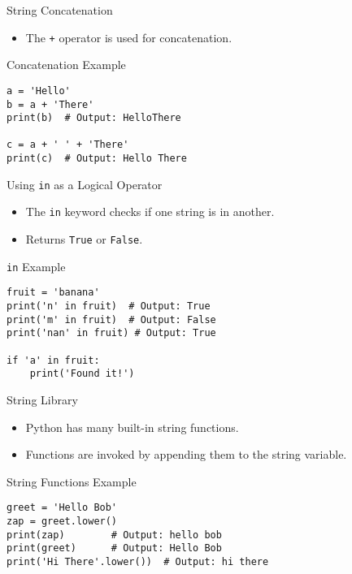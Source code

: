 \documentclass[serif, aspectratio=169]{beamer}
\begin{document}
\begin{frame}{String Concatenation}
    \begin{itemize}
        \item The \texttt{+} operator is used for concatenation.
    \end{itemize}
\end{frame}

\begin{frame}[fragile]{Concatenation Example}
    \begin{lstlisting}
a = 'Hello'
b = a + 'There'
print(b)  # Output: HelloThere

c = a + ' ' + 'There'
print(c)  # Output: Hello There
    \end{lstlisting}
\end{frame}

\begin{frame}{Using \texttt{in} as a Logical Operator}
    \begin{itemize}
        \item The \texttt{\color{red}in} keyword checks if one string is in another.
        \item Returns \texttt{True} or \texttt{False}.
    \end{itemize}
\end{frame}

\begin{frame}[fragile]{\texttt{in} Example}
    \begin{lstlisting}
fruit = 'banana'
print('n' in fruit)  # Output: True
print('m' in fruit)  # Output: False
print('nan' in fruit) # Output: True

if 'a' in fruit:
    print('Found it!')
    \end{lstlisting}
\end{frame}

\begin{frame}{String Library}
    \begin{itemize}
        \item Python has many built-in string functions.
        \item Functions are invoked by appending them to the string variable.
    \end{itemize}
\end{frame}

\begin{frame}[fragile]{String Functions Example}
    \begin{lstlisting}
greet = 'Hello Bob'
zap = greet.lower()
print(zap)        # Output: hello bob
print(greet)      # Output: Hello Bob
print('Hi There'.lower())  # Output: hi there
    \end{lstlisting}
\end{frame}
\end{document}
